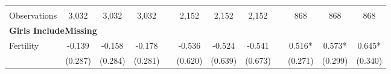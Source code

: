 \begin{landscape}
\begin{table}[htpb!]
\begin{center}
\begin{tabular}{lcccp{2mm}cccp{2mm}ccc}
\begin{footnotesize}\end{footnotesize}&\begin{footnotesize}\end{footnotesize}&\begin{footnotesize}\end{footnotesize}&\begin{footnotesize}\end{footnotesize}&\begin{footnotesize}\end{footnotesize}&\begin{footnotesize}\end{footnotesize}&\begin{footnotesize}\end{footnotesize}&\begin{footnotesize}\end{footnotesize}&\begin{footnotesize}\end{footnotesize}&\begin{footnotesize}\end{footnotesize}&\begin{footnotesize}\end{footnotesize}&\begin{footnotesize}\end{footnotesize}\\Observations&3,032&3,032&3,032&&2,152&2,152&2,152&&868&868&868\\
\multicolumn{12}{l}{\textbf{Girls IncludeMissing}}\\ 
Fertility&-0.139&-0.158&-0.178&&-0.536&-0.524&-0.541&&0.516*&0.573*&0.645*\\
&(0.287)&(0.284)&(0.281)&&(0.620)&(0.639)&(0.673)&&(0.271)&(0.299)&(0.340)\\

\end{tabular}
\end{center}
\end{table}
\end{landscape}
